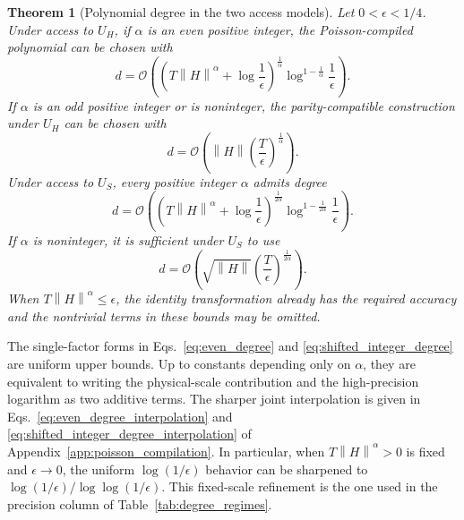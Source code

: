 \documentclass[aps,pra,reprint,floatfix,unsortedaddress,superscriptaddress]{revtex4-2}
\newtheorem{theorem}{Theorem}[section]
\newcommand{\norm}[1]{\left\lVert#1\right\rVert}
\newcommand{\Ocal}{\mathcal{O}}
\begin{document}
\begin{theorem}[Polynomial degree in the two access models]
\label{thm:degree}
Let $0<\epsilon<1/4$.  Under access to $U_H$, if $\alpha$ is an even
positive integer, the Poisson-compiled polynomial can be chosen with
\begin{equation}
    d
    =
    \Ocal\!\left(
        \left(
        T\norm{H}^{\alpha}+\log\frac{1}{\epsilon}
        \right)^{\frac{1}{\alpha}}
        \log^{1-\frac{1}{\alpha}}\frac{1}{\epsilon}
    \right).
    \label{eq:even_degree}
\end{equation}
If $\alpha$ is an odd positive integer or is noninteger, the
parity-compatible construction under $U_H$ can be chosen with
\begin{equation}
    d
    =
    \Ocal\!\left(
        \norm{H}
        \left(\frac{T}{\epsilon}\right)^{\frac{1}{\alpha}}
    \right).
    \label{eq:noneven_degree}
\end{equation}
Under access to $U_S$, every positive integer $\alpha$ admits degree
\begin{equation}
    d
    =
    \Ocal\!\left(
        \left(
        T\norm{H}^{\alpha}+\log\frac{1}{\epsilon}
        \right)^{\frac{1}{2\alpha}}
        \log^{1-\frac{1}{2\alpha}}\frac{1}{\epsilon}
    \right).
    \label{eq:shifted_integer_degree}
\end{equation}
If $\alpha$ is noninteger, it is sufficient under $U_S$ to use
\begin{equation}
    d
    =
    \Ocal\!\left(
        \sqrt{\norm{H}}
        \left(\frac{T}{\epsilon}\right)^{\frac{1}{2\alpha}}
    \right).
    \label{eq:shifted_fractional_degree}
\end{equation}
When $T\norm{H}^{\alpha}\leq\epsilon$, the identity transformation already has the
required accuracy and the nontrivial terms in these bounds may be
omitted.
\end{theorem}

The single-factor forms in Eqs.~\eqref{eq:even_degree} and
\eqref{eq:shifted_integer_degree} are uniform upper bounds.  Up to
constants depending only on $\alpha$, they are equivalent to writing
the physical-scale contribution and the high-precision logarithm as
two additive terms.  The sharper joint interpolation is given in
Eqs.~\eqref{eq:even_degree_interpolation} and
\eqref{eq:shifted_integer_degree_interpolation} of
Appendix~\ref{app:poisson_compilation}.  In particular, when
$T\norm{H}^{\alpha}>0$ is fixed and $\epsilon\to0$, the uniform
$\log(1/\epsilon)$ behavior can be sharpened to
$\log(1/\epsilon)/\log\log(1/\epsilon)$.  This fixed-scale refinement
is the one used in the precision column of
Table~\ref{tab:degree_regimes}.
\end{document}
